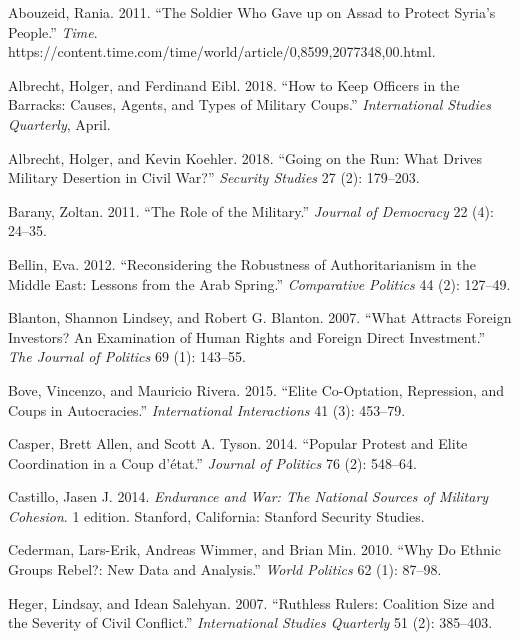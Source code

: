 \documentclass[
  12pt,
]{article}
\newlength{\cslhangindent}
\newenvironment{cslreferences}%
  {\setlength{\parindent}{0pt}%
  \everypar{\setlength{\hangindent}{\cslhangindent}}\ignorespaces}%
  {\par}
\begin{document}
\hypertarget{refs}{}
\begin{cslreferences}
\leavevmode\hypertarget{ref-Abouzeid2011}{}%
Abouzeid, Rania. 2011. ``The Soldier Who Gave up on Assad to Protect Syria's People.'' \emph{Time}. https://content.time.com/time/world/article/0,8599,2077348,00.html.

\leavevmode\hypertarget{ref-Albrecht2018a}{}%
Albrecht, Holger, and Ferdinand Eibl. 2018. ``How to Keep Officers in the Barracks: Causes, Agents, and Types of Military Coups.'' \emph{International Studies Quarterly}, April.

\leavevmode\hypertarget{ref-Albrecht2018}{}%
Albrecht, Holger, and Kevin Koehler. 2018. ``Going on the Run: What Drives Military Desertion in Civil War?'' \emph{Security Studies} 27 (2): 179--203.

\leavevmode\hypertarget{ref-Barany2011}{}%
Barany, Zoltan. 2011. ``The Role of the Military.'' \emph{Journal of Democracy} 22 (4): 24--35.

\leavevmode\hypertarget{ref-Bellin2012}{}%
Bellin, Eva. 2012. ``Reconsidering the Robustness of Authoritarianism in the Middle East: Lessons from the Arab Spring.'' \emph{Comparative Politics} 44 (2): 127--49.

\leavevmode\hypertarget{ref-Blanton2007}{}%
Blanton, Shannon Lindsey, and Robert G. Blanton. 2007. ``What Attracts Foreign Investors? An Examination of Human Rights and Foreign Direct Investment.'' \emph{The Journal of Politics} 69 (1): 143--55.

\leavevmode\hypertarget{ref-Bove2015a}{}%
Bove, Vincenzo, and Mauricio Rivera. 2015. ``Elite Co-Optation, Repression, and Coups in Autocracies.'' \emph{International Interactions} 41 (3): 453--79.

\leavevmode\hypertarget{ref-Casper2014}{}%
Casper, Brett Allen, and Scott A. Tyson. 2014. ``Popular Protest and Elite Coordination in a Coup d'état.'' \emph{Journal of Politics} 76 (2): 548--64.

\leavevmode\hypertarget{ref-Castillo2014}{}%
Castillo, Jasen J. 2014. \emph{Endurance and War: The National Sources of Military Cohesion}. 1 edition. Stanford, California: Stanford Security Studies.

\leavevmode\hypertarget{ref-Cederman2010}{}%
Cederman, Lars-Erik, Andreas Wimmer, and Brian Min. 2010. ``Why Do Ethnic Groups Rebel?: New Data and Analysis.'' \emph{World Politics} 62 (1): 87--98.

\leavevmode\hypertarget{ref-Heger2007a}{}%
Heger, Lindsay, and Idean Salehyan. 2007. ``Ruthless Rulers: Coalition Size and the Severity of Civil Conflict.'' \emph{International Studies Quarterly} 51 (2): 385--403.


\end{cslreferences}
\end{document}
